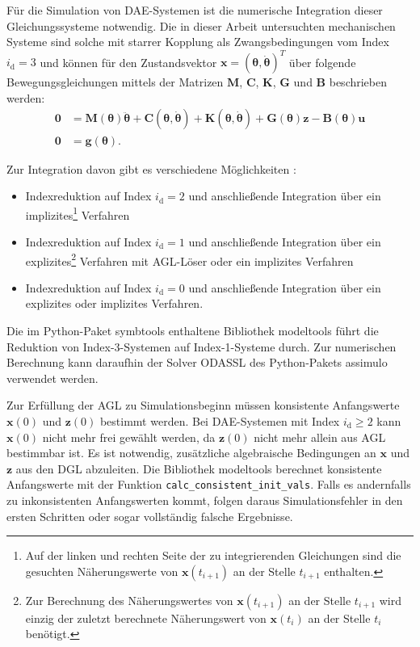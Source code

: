 Für die Simulation von DAE-Systemen ist die numerische Integration dieser Gleichungssysteme notwendig. Die in dieser Arbeit untersuchten mechanischen Systeme sind solche mit starrer Kopplung als Zwangsbedingungen vom Index $i_\mathrm{d} = 3$ und können für den Zustandsvektor $\mathbf{x} = (\boldsymbol{\theta}, \dot{\boldsymbol{\theta}})^T$ über folgende Bewegungsgleichungen mittels der Matrizen $\mathbf{M}$, $\mathbf{C}$, $\mathbf{K}$, $\mathbf{G}$ und $\mathbf{B}$ beschrieben werden:
\begin{subequations}
\label{eq:implicit_mechanical_system}
\begin{align}
	\mathbf{0} &= \mathbf{M}(\boldsymbol{\theta}) \ddot{\boldsymbol{\theta}} + \mathbf{C}(\boldsymbol{\theta}, \dot{\boldsymbol{\theta}}) + \mathbf{K}(\boldsymbol{\theta}, \dot{\boldsymbol{\theta}}) + \mathbf{G}(\boldsymbol{\theta}) \mathbf{z} - \mathbf{B}(\boldsymbol{\theta}) \mathbf{u}\\
	\mathbf{0} &= \mathbf{g}(\boldsymbol{\theta}).
\end{align}
\end{subequations}
\cite[S.240]{JanschekSystementwurf}

Zur Integration davon gibt es verschiedene Möglichkeiten \cite[Kap. 8]{ModSimSkript}: 
\begin{itemize}
\item  Indexreduktion auf Index $i_\mathrm{d} = 2$ und anschließende Integration über ein implizites\footnote{Auf der linken und rechten Seite der zu integrierenden Gleichungen sind die gesuchten Näherungswerte von $\mathbf{x}(t_{i+1})$ an der Stelle $t_{i+1}$ enthalten.} Verfahren
\item Indexreduktion auf Index $i_\mathrm{d} = 1$ und anschließende Integration über ein explizites\footnote{Zur Berechnung des Näherungswertes von $\mathbf{x}(t_{i+1})$ an der Stelle $t_{i+1}$ wird einzig der zuletzt berechnete Näherungswert von $\mathbf{x}(t_{i})$ an der Stelle $t_{i}$ benötigt.} Verfahren mit AGL-Löser oder ein implizites Verfahren
\item Indexreduktion auf Index  $i_\mathrm{d} = 0$ und anschließende Integration über ein explizites oder implizites Verfahren.
\end{itemize}
Die im Python-Paket symbtools \cite{symbtools} enthaltene Bibliothek modeltools führt die Reduktion von Index-3-Systemen auf Index-1-Systeme durch. Zur numerischen Berechnung kann daraufhin der Solver ODASSL des Python-Pakets assimulo \cite{assimulo} verwendet werden.

Zur Erfüllung der AGL zu Simulationsbeginn müssen konsistente Anfangswerte $\mathbf{x}(0)$ und $\mathbf{z}(0)$ bestimmt werden. Bei DAE-Systemen mit Index $i_\mathrm{d} \geq 2$  kann $\mathbf{x}(0)$ nicht mehr frei gewählt werden, da $\mathbf{z}(0)$ nicht mehr allein aus AGL bestimmbar ist. Es ist notwendig, zusätzliche algebraische Bedingungen an $\mathbf{x}$ und $\mathbf{z}$ aus den DGL abzuleiten. Die Bibliothek modeltools berechnet konsistente Anfangswerte mit der Funktion \texttt{calc\_consistent\_init\_vals}. Falls es andernfalls zu inkonsistenten Anfangswerten kommt, folgen daraus Simulationsfehler in den ersten Schritten oder sogar vollständig falsche Ergebnisse. \cite[S.207]{JanschekSystementwurf}

